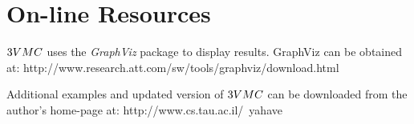 \section{On-line Resources}

$\tvmc$ uses the \emph{GraphViz} package to display results.
GraphViz can be obtained at:
http://www.research.att.com/sw/tools/graphviz/download.html

Additional examples and updated version of $\tvmc$ can be
downloaded from the author's home-page at:
http://www.cs.tau.ac.il/~yahave
